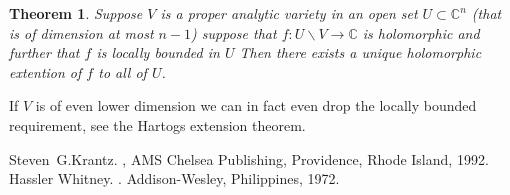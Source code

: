 \documentclass[12pt]{article}
\theoremstyle{theorem}
\newtheorem*{thm}{Theorem}
\theoremstyle{definition}
\theoremstyle{remark}
\begin{document}
\begin{thm}
Suppose $V$ is a proper analytic variety in an open set $U \subset
{\mathbb{C}}^n$ (that is of dimension at most $n-1$)
suppose that $f \colon U \backslash V \to
{\mathbb{C}}$ is holomorphic and further that $f$ is locally bounded in $U$
Then there exists a unique holomorphic
extention of $f$ to all of $U$.
\end{thm}

If $V$ is of even lower dimension we can in fact even drop the locally bounded
requirement, see the Hartogs extension theorem.

\begin{thebibliography}{9}
Steven~G.\@ Krantz.
{\em {}},
AMS Chelsea Publishing, Providence, Rhode Island, 1992.
Hassler Whitney.
{\em {}}.
Addison-Wesley, Philippines, 1972.
\end{thebibliography}
\end{document}
